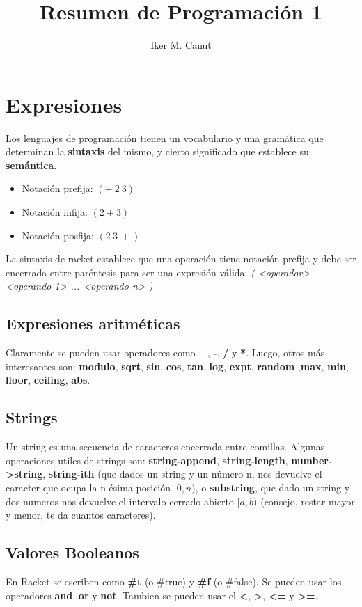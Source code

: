 \documentclass[11pt,a4paper]{article}
\begin{document}
\title{Resumen de Programación 1}
\author{Iker M. Canut}
\maketitle
\newpage

\section{Expresiones}
Los lenguajes de programación tienen un vocabulario y una gramática que determinan la \textbf{sintaxis} del mismo, y cierto significado que establece su \textbf{semántica}.
\begin{multicols}{3}
\begin{itemize}
\item Notación prefija: $(+\ 2\ 3)$
\item Notación infija:  $(2 + 3)$ 
\item Notación posfija: $(2\ 3\ +)$ 
\end{itemize}
\end{multicols}
La sintaxis de racket establece que una operación tiene notación prefija y debe ser encerrada entre paréntesis para ser una expresión válida: \textit{( <operador> <operando 1> ... <operando n> )}

\subsection{Expresiones aritméticas}
Claramente se pueden usar operadores como \textbf{+}, \textbf{-}, \textbf{/} y \textbf{*}. Luego, otros más interesantes son: \textbf{modulo}, \textbf{sqrt}, \textbf{sin}, \textbf{cos}, \textbf{tan}, \textbf{log}, \textbf{expt}, \textbf{random} ,\textbf{max}, \textbf{min}, \textbf{floor}, \textbf{ceiling}, \textbf{abs}.

\subsection{Strings}
Un string es una secuencia de caracteres encerrada entre comillas. Algunas operaciones utiles de strings son: \textbf{string-append}, \textbf{string-length}, \textbf{number->string}, \textbf{string-ith} (que dados un string y un n\'umero n, nos devuelve el caracter que ocupa la n-ésima posición $[0, n)$, o \textbf{substring}, que dado un string y dos numeros nos devuelve el intervalo cerrado abierto $[a,b)$ (consejo, restar mayor y menor, te da cuantos caracteres).

\subsection{Valores Booleanos}
En Racket se escriben como \textbf{\#t} (o \#true) y \textbf{\#f} (o \#false). Se pueden usar los operadores \textbf{and}, \textbf{or} y \textbf{not}. Tambien se pueden usar el \textbf{<}, \textbf{>}, \textbf{<=} y \textbf{>=}.
\end{document}
